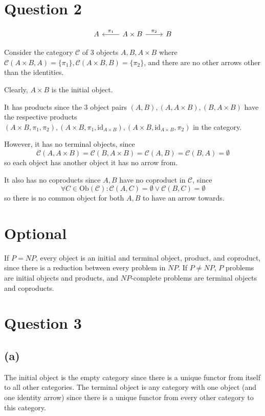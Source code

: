 \documentclass[11pt]{article} %
\theoremstyle{definition}
\begin{document}
\section*{Question 2}
\addtocounter{section}{1}
\[\begin{tikzcd}
	A & {A\times B} & B
	\arrow["{\pi_2}", from=1-2, to=1-3]
	\arrow["{\pi_1}"', from=1-2, to=1-1]
\end{tikzcd}\]

Consider the category $\mathcal{C}$ of 3 objects $A,B,A\times B$ 
where $\mathcal{C}(A\times B,A)=\{\pi_1\},\mathcal{C}(A\times B, B)=\{\pi_2\}$,
and there are no other arrows other than the identities.

Clearly, $A\times B$ is the initial object.

It has products since the 3 object pairs $(A,B),(A,A\times B),(B, A\times B)$ have the respective products
$(A\times B, \pi_1,\pi_2), (A\times B, \pi_1,\text{id}_{A\times B}),(A\times B,\text{id}_{A\times B},\pi_2)$
in the category.

However, it has no terminal objects, since 
\[\mathcal{C}(A,A\times B)=\mathcal{C}(B,A\times B)=\mathcal{C}(A,B)=\mathcal{C}(B,A)=\emptyset\]
so each object has another object it has no arrow from.

It also has no coproducts since $A,B$ have no coproduct in $\mathcal{C}$, since 
\[\forall C\in\text{Ob}(\mathcal{C}):\mathcal{C}(A,C)=\emptyset \vee \mathcal{C}(B,C)=\emptyset\]
so there is no common object for both $A,B$ to have an arrow towards.

\section*{Optional}
If $P=NP$, every object is an initial and terminal object, product, and coproduct,
since there is a reduction between every problem in $NP$.
If $P\neq NP$, $P$ problems are initial objects and products, 
and $NP$-complete problems are terminal objects and coproducts.

\clearpage
\section*{Question 3}
\addtocounter{section}{1}
\subsection*{(a)}
The initial object is the empty category since there is a unique functor from itself to all other categories.
The terminal object is any category with one object (and one identity arrow)
since there is a unique functor from every other category to this category.
\end{document}
